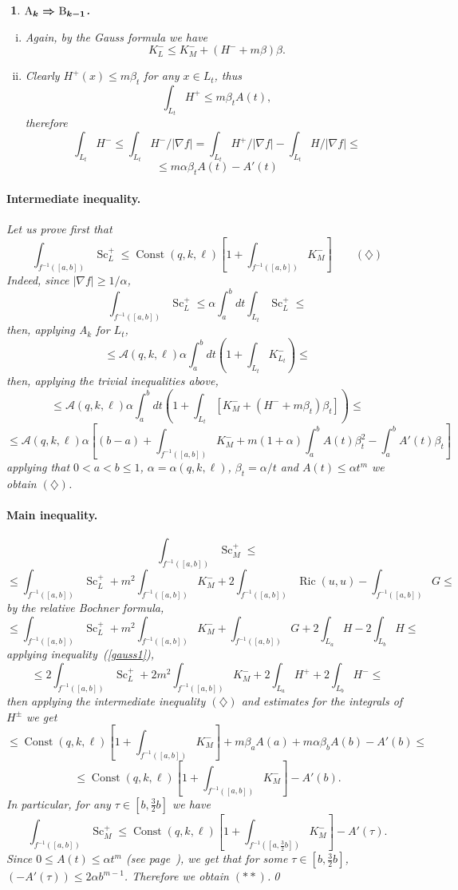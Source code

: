 \documentclass{article}
\def\cA{{\mathcal A}}
\def\ge{\geqslant}
\def\le{\leqslant}
\def\l{\left}
\def\r{\right}
\def\Const{\operatorname{Const}}
\def\Ric{\operatorname{Ric}}
\def\Sc{\operatorname{Sc}}
\newtheorem{Nothing}[thm]{$\!\!\!$}
\newenvironment{nothing}{\begin{Nothing}\rm}{\end{Nothing}}
\begin{document}
\begin{nothing}{\bf$\boldmath{\text{A}_{k}\Rightarrow\text{B}_{k-1}}$.}
\begin{enumerate}[(i)]
therefore
$$
\Sc^+_{M}
\le
\Sc^+_{L}+m(m-1)K^-_{M}+2\Ric_{M}(u,u)-G
\le$$
$$\le
\Sc^+_{L}+m^2K^-_{M}+2\Ric_{M}(u,u)-G.
$$
and
$$G\le \Sc^+_{L} + (m-1)(m-2)K^-_{M}\le$$
$$\le \Sc^+_{L} + m^2K^-_{M}$$

\item\label{gauss2} Again, by the Gauss formula we have
$$K^-_{L}\le K^-_{M}+ (H^-+m\beta)\beta.$$

\item\label{H} Clearly $H^+(x)\le m\beta_t$ for any $x\in L_t$, thus
$$\int_{L_t}H^+\le m\beta_t A(t),$$
therefore
$$\int_ {L_t}H^-\le \int_{L_t}H^-/|\nabla f|
=
\int_{L_t}H^+/|\nabla f|-\int_{L_t}H/|\nabla f|\le$$
$$\le m\alpha \beta_t A(t)-A'(t)$$
\end{enumerate}

\paragraph{\bf Intermediate inequality.} Let us prove first that
$$\int_{f^{-1}([a,b])}\Sc^+_{L}
\le \Const(q,k,\ell)\l[1+\int_{f^{-1}([a,b])}K^-_{M}\r]\qquad (\diamondsuit)$$
Indeed, since $|\nabla f|\ge 1/\alpha$,
$$\int_{f^{-1}([a,b])}\Sc^+_{L}
\le
\alpha\int_a^b d t \int_{L_t}\Sc^+_{L}
\le $$
then, applying A$_k$ for $L_t$,
$$
\le \cA(q,k,\ell)\alpha\int_a^b d t\l(1+\int_{L_t} K^-_{L_t}\r)
\le$$
then, applying the trivial inequalities above,
$$\le
\cA(q,k,\ell)\alpha\int_a^b d t\l(1+\int_{L_t} [K^-_{M}+ (H^-+m\beta_t)\beta_t]\r)
\le$$
$$
\le \cA(q,k,\ell)\alpha\l[(b-a)+\int_{f^{-1}([a,b])}K^-_{M}+m(1+\alpha)\int_a^b A(t)\beta_t^2-\int_a^b A'(t)\beta_t\r]$$
applying that $0<a<b\le 1$, $\alpha=\alpha(q,k,\ell)$, $\beta_t=\alpha/t$ and $A(t)\le \alpha t^m$ we obtain $(\diamondsuit)$.


\paragraph*{Main inequality.}
$$\int_{f^{-1}([a,b])}\Sc^+_{M}
\le $$
$$\le
\int_{f^{-1}([a,b])}\Sc^+_{L}
+m^2\int_{f^{-1}([a,b])}K^-_{M}
+2\int_{f^{-1}([a,b])}\Ric(u,u)-\int_{f^{-1}([a,b])}G
\le
$$
by the relative Bochner formula,
$$
\le
\int_{f^{-1}([a,b])}\Sc^+_{L}
+m^2\int_{f^{-1}([a,b])}K^-_{M}
+\int_{f^{-1}([a,b])}G
+2\int_{L_a}H
-2\int_{L_b}H
\le
$$
applying inequality~(\ref{gauss1}),
$$
\le
2\int_{f^{-1}([a,b])}\Sc^+_{L}
+2m^2\int_{f^{-1}([a,b])}K^-_{M}
+2\int_{L_a}H^+
+2\int_{L_b}H^-
\le
$$
then applying the intermediate inequality $(\diamondsuit)$ and estimates for
the integrals of $H^\pm$ we get
$$\le\Const(q,k,\ell)\l[1+\int_{f^{-1}([a,b])}K^-_{M}\r] +m\beta_a A(a)+m\alpha \beta_b A(b)-A'(b)\le$$
$$\le \Const(q,k,\ell)\l[1+\int_{f^{-1}([a,b])}K^-_{M}\r]-A'(b).$$
In particular, for any $\tau\in [b,\tfrac32b]$ we have
$$\int_{f^{-1}([a,b])}\Sc^+_{M}
\le \Const(q,k,\ell)\l[1+\int_{f^{-1}([a,\tfrac32b])}K^-_{M}\r]-A'(\tau).$$
Since $0\le A(t)\le \alpha t^m$ (see page~\pageref{f-prop}), we get that for some $\tau\in [b,\tfrac32b]$, $(-A'(\tau))\le 2\alpha b^{m-1}$. Therefore we obtain $(**)$.\qed



\end{nothing}
\end{document}
